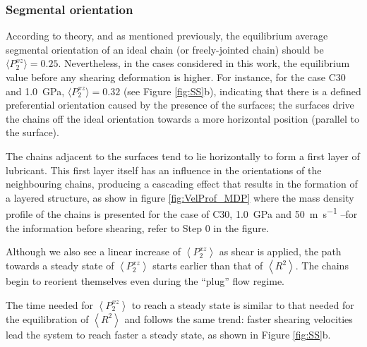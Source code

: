 \documentclass[aps,prb,reprint,superscriptaddress, a4paper]{revtex4-1}
\begin{document}

\subsubsection{Segmental orientation}
 
 According to theory, and as mentioned previously, the equilibrium average segmental orientation of an ideal chain (or freely-jointed chain)  should be $\langle P_{2}^{xz}\rangle=0.25$. Nevertheless, in the cases considered in this work, the equilibrium value before any shearing deformation is higher. For instance, for the case C30 and  \SI{1.0}{\giga\pascal}, $\langle P_{2}^{xz}\rangle=0.32$ (see Figure \ref{fig:SS}b), indicating that there is  a defined preferential orientation caused by the presence of the surfaces; the surfaces  drive  the chains off the ideal orientation towards a more horizontal position (parallel to the surface). %
 
The chains adjacent  to the surfaces tend to lie horizontally  to form a first  layer of lubricant. This first layer itself has an influence in the orientations of the neighbouring chains, producing  a cascading effect that results in the formation of  a layered structure, as show in figure \ref{fig:VelProf_MDP} where the mass density profile of the chains is presented for the case of  C30,  \SI{1.0}{\giga\pascal} and  \SI{50}{\meter\per\second} --for the information before shearing, refer to Step 0 in the figure. 





Although we also see a linear increase of $\left<P_{2}^{xz} \right> $ as shear is applied, the path towards a steady state of  $\left<P_{2}^{xz} \right> $ starts earlier than that of  $\left< R^2 \right> $. The chains begin to reorient themselves even during the ``plug'' flow regime. %

The time needed for $\left<P_{2}^{xz} \right>$ to reach a steady state  is similar to that needed for the equilibration of  $\left< R^2 \right> $ and follows the same trend: faster shearing velocities lead the system  to reach faster a steady state, as shown in  Figure \ref{fig:SS}b.
\end{document}
